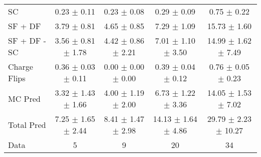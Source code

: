 \begin{tabular}{l|cccc}
                                 SC &  0.23 $\pm$  0.11 &  0.23 $\pm$  0.08 &  0.29 $\pm$  0.09 &  0.75 $\pm$  0.22 \\
                            SF + DF &  3.79 $\pm$  0.81 &  4.65 $\pm$  0.85 &  7.29 $\pm$  1.09 & 15.73 $\pm$  1.60 \\
\hline
                       SF + DF - SC &  3.56 $\pm$  0.81 $\pm$  1.78 &  4.42 $\pm$  0.86 $\pm$  2.21 &  7.01 $\pm$  1.10 $\pm$  3.50 & 14.99 $\pm$  1.62 $\pm$  7.49 \\
\hline\hline
                       Charge Flips &  0.36 $\pm$  0.03 $\pm$  0.11 &  0.00 $\pm$  0.00 $\pm$  0.00 &  0.39 $\pm$  0.04 $\pm$  0.12 &  0.76 $\pm$  0.05 $\pm$  0.23 \\
\hline
                            MC Pred &  3.32 $\pm$  1.43 $\pm$  1.66 &  4.00 $\pm$  1.19 $\pm$  2.00 &  6.73 $\pm$  1.22 $\pm$  3.36 & 14.05 $\pm$  1.53 $\pm$  7.02 \\
\hline
                         Total Pred &  7.25 $\pm$  1.65 $\pm$  2.44 &  8.41 $\pm$  1.47 $\pm$  2.98 & 14.13 $\pm$  1.64 $\pm$  4.86 & 29.79 $\pm$  2.23 $\pm$ 10.27 \\
\hline\hline
                               Data &     5 &     9 &    20 &    34 \\
\hline\hline
\end{tabular}

